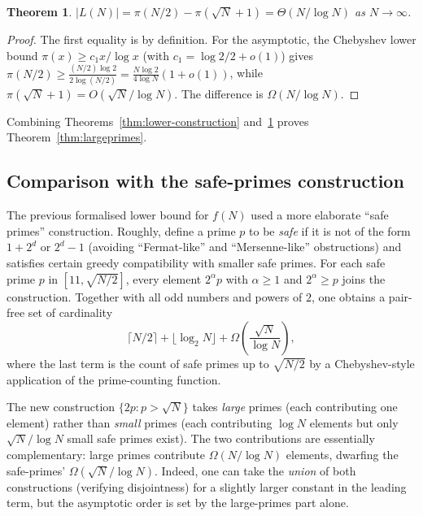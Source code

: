 \documentclass[11pt]{amsart}
\theoremstyle{plain}
\newtheorem{theorem}{Theorem}[section]
\theoremstyle{definition}
\begin{document}
\begin{theorem}\label{thm:LN-asymptotic}
$|L(N)| = \pi(N/2) - \pi(\sqrt{N} + 1) = \Theta(N / \log N)$ as $N \to \infty$.
\end{theorem}

\begin{proof}
The first equality is by definition. For the asymptotic, the Chebyshev lower bound $\pi(x) \geq c_1 x / \log x$ (with $c_1 = \log 2 / 2 + o(1)$) gives $\pi(N/2) \geq \frac{(N/2) \log 2}{2 \log(N/2)} = \frac{N \log 2}{4 \log N}(1 + o(1))$, while $\pi(\sqrt{N} + 1) = O(\sqrt{N}/\log N)$. The difference is $\Omega(N/\log N)$.
\end{proof}

Combining Theorems~\ref{thm:lower-construction} and~\ref{thm:LN-asymptotic} proves Theorem~\ref{thm:largeprimes}.

\subsection{Comparison with the safe-primes construction}\label{sec:safe-primes-summary}

The previous formalised lower bound for $f(N)$ used a more elaborate ``safe primes'' construction. Roughly, define a prime $p$ to be \emph{safe} if it is not of the form $1 + 2^d$ or $2^d - 1$ (avoiding ``Fermat-like'' and ``Mersenne-like'' obstructions) and satisfies certain greedy compatibility with smaller safe primes. For each safe prime $p$ in $[11, \sqrt{N/2}]$, every element $2^{\alpha} p$ with $\alpha \geq 1$ and $2^{\alpha} \geq p$ joins the construction. Together with all odd numbers and powers of $2$, one obtains a pair-free set of cardinality
\[
  \lceil N/2 \rceil + \lfloor \log_2 N \rfloor + \Omega\!\left(\frac{\sqrt{N}}{\log N}\right),
\]
where the last term is the count of safe primes up to $\sqrt{N/2}$ by a Chebyshev-style application of the prime-counting function.

The new construction $\{2p : p > \sqrt{N}\}$ takes \emph{large} primes (each contributing one element) rather than \emph{small} primes (each contributing $\log N$ elements but only $\sqrt{N}/\log N$ small safe primes exist). The two contributions are essentially complementary: large primes contribute $\Omega(N/\log N)$ elements, dwarfing the safe-primes' $\Omega(\sqrt{N}/\log N)$. Indeed, one can take the \emph{union} of both constructions (verifying disjointness) for a slightly larger constant in the leading term, but the asymptotic order is set by the large-primes part alone.
\end{document}
